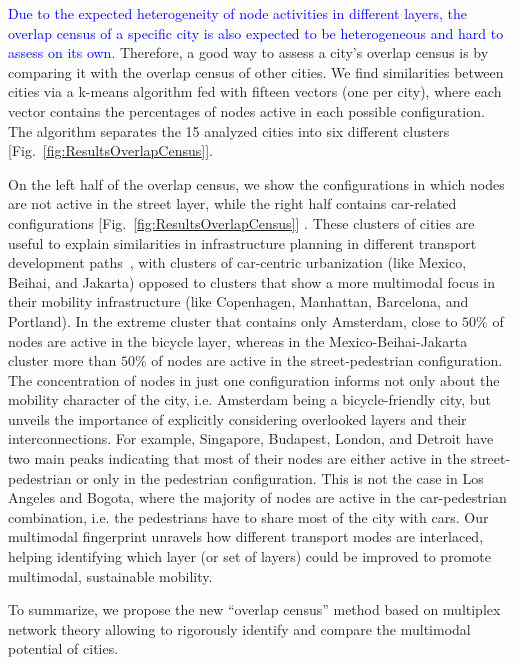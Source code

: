 \textcolor{blue}{Due to the expected heterogeneity of node activities in different layers, the overlap census of a specific city is also expected to be heterogeneous and hard to assess on its own.} Therefore, a good way to assess a city's overlap census is by comparing it with the overlap census of other cities. We find similarities between cities via a k-means algorithm fed with fifteen vectors (one per city), where each vector contains the percentages of nodes active in each possible configuration. The algorithm separates the 15 analyzed cities into six different clusters [Fig.~\ref{fig:ResultsOverlapCensus}].

On the left half of the overlap census, we show the configurations in which nodes are not active in the street layer, while the right half contains car-related configurations [Fig.~\ref{fig:ResultsOverlapCensus}] . These clusters of cities are useful to explain similarities in infrastructure planning in different transport development paths~\cite{Rodrigue2013Geography,Louf2014Typology}, with clusters of car-centric urbanization (like Mexico, Beihai, and Jakarta) opposed to clusters that show a more multimodal focus in their mobility infrastructure (like Copenhagen, Manhattan, Barcelona, and Portland). In the extreme cluster that contains only Amsterdam, close to $50\%$ of nodes are active in the bicycle layer, whereas in the Mexico-Beihai-Jakarta cluster more than $50\%$ of nodes are active in the street-pedestrian configuration. The concentration of nodes in just one configuration informs not only about the mobility character of the city, i.e. Amsterdam being a bicycle-friendly city, but unveils the importance of explicitly considering overlooked layers and their interconnections. For example, Singapore, Budapest, London, and Detroit have two main peaks indicating that most of their nodes are either active in the street-pedestrian or only in the pedestrian configuration. This is not the case in Los Angeles and Bogota, where the majority of nodes are active in the car-pedestrian combination, i.e. the pedestrians have to share most of the city with cars. Our multimodal fingerprint unravels how different transport modes are interlaced, helping identifying which layer (or set of layers) could be improved to promote multimodal, sustainable mobility.

To summarize, we propose the new ``overlap census'' method based on multiplex network theory allowing to rigorously identify and compare the multimodal potential of cities.
